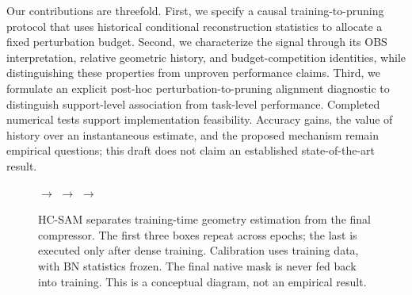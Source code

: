 Our contributions are threefold. First, we specify a causal training-to-pruning protocol that uses historical conditional reconstruction statistics to allocate a fixed perturbation budget. Second, we characterize the signal through its OBS interpretation, relative geometric history, and budget-competition identities, while distinguishing these properties from unproven performance claims. Third, we formulate an explicit post-hoc perturbation-to-pruning alignment diagnostic to distinguish support-level association from task-level performance. Completed numerical tests support implementation feasibility. Accuracy gains, the value of history over an instantaneous estimate, and the proposed mechanism remain empirical questions; this draft does not claim an established state-of-the-art result.

\begin{figure}[t]
\centering
\setlength{\fboxsep}{7pt}
\hfill$\longrightarrow$\hfill
{}
\hfill$\longrightarrow$\hfill
{}
\hfill$\longrightarrow$\hfill
{}
\caption{HC-SAM separates training-time geometry estimation from the final compressor. The first three boxes repeat across epochs; the last is executed only after dense training. Calibration uses training data, with BN statistics frozen. The final native mask is never fed back into training. This is a conceptual diagram, not an empirical result.}
\label{fig:overview}
\end{figure}
